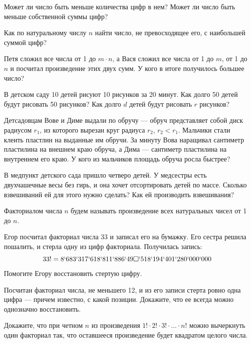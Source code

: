 ﻿%
\begin{itemize}
\itA Может ли число быть меньше количества цифр в нем? Может ли число быть меньше собственной суммы цифр?

\itB Как по натуральному числу $n$ найти число, не превосходящее его, с наибольшей суммой цифр?

\itC Петя сложил все числа от 1 до $m \cdot n$, а Вася сложил все числа от 1 до $m$, от 1 до $n$ и посчитал произведение этих двух сумм. У кого в итоге получилось большее число?
\end{itemize}

\begin{itemize}
\itA В детском саду 10 детей рисуют 10 рисунков за 20 минут. Как долго 50 детей будут рисовать 50 рисунков? Как долго $d$ детей будут рисовать $r$ рисунков?

\itB Детсадовцам Вове и Диме выдали по обручу — обруч представляет собой диск радиусом $r_1$, из которого вырезан круг радиуса $r_2$, $r_2<r_1$. Мальчики стали клеить пластлин на выданные им обручи. За минуту Вова наращивал сантиметр пластилина на внешнем краю обруча, а Дима — сантиметр пластилина на внутреннем его краю. У кого из мальчиков площадь обруча росла быстрее?

\itC В медпункт детского сада пришло четверо детей. У медсестры есть двухчашечные весы без гирь, и она хочет отсортировать детей по массе. Сколько взвешиваний ей для этого нужно сделать? Как ей производить взвешивания?
\end{itemize}

Факториалом числа $n$ будем называть произведение всех натуральных чисел от 1 до $n$.

\begin{itemize}
\itA Егор посчитал факториал числа 33 и записал его на бумажку. Его сестра решила пошалить, и стерла одну из цифр факториала. Получилась запись:
	$$33! = 8`683`317`618`811`886`49\square`518`194`401`280`000`000$$
Помогите Егору восстановить стертую цифру.

\itB Посчитан факториал числа, не меньшего 12, и из его записи стерта ровно одна цифра — причем известно, с какой позиции. Докажите, что ее всегда можно однозначно восстановить.

\itC Докажите, что при четном $n$ из произведения $1! \cdot 2! \cdot 3! \cdot \ldots \cdot n!$ можно вычеркнуть один факториал так, что оставшееся произведение будет квадратом целого числа.
\end{itemize}

